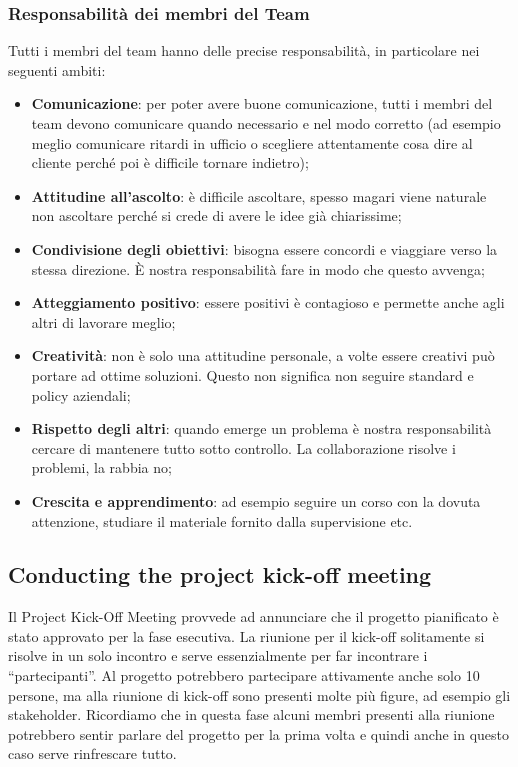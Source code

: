 \subsubsection{Responsabilità dei membri del Team}
Tutti i membri del team hanno delle precise responsabilità, in particolare nei seguenti ambiti:
\begin{itemize}
	\item \textbf{Comunicazione}: per poter avere buone comunicazione, tutti i membri del team devono comunicare quando necessario e nel modo corretto (ad esempio meglio comunicare ritardi in ufficio o scegliere attentamente cosa dire al cliente perché poi è difficile tornare indietro);
	\item \textbf{Attitudine all’ascolto}: è difficile ascoltare, spesso magari viene naturale non ascoltare perché si crede di avere le idee già chiarissime;
	\item \textbf{Condivisione degli obiettivi}: bisogna essere concordi e viaggiare verso la stessa direzione. È nostra responsabilità fare in modo che questo avvenga;
	\item \textbf{Atteggiamento positivo}: essere positivi è contagioso e permette anche agli altri di lavorare meglio;
	\item \textbf{Creatività}: non è solo una attitudine personale, a volte essere creativi può portare ad ottime soluzioni. Questo non significa non seguire standard e policy aziendali;
	\item \textbf{Rispetto degli altri}: quando emerge un problema è nostra responsabilità cercare di mantenere tutto sotto controllo. La collaborazione risolve i problemi, la rabbia no;
	\item \textbf{Crescita e apprendimento}: ad esempio seguire un corso con la dovuta attenzione, studiare il materiale fornito dalla supervisione etc.
\end{itemize}

\subsection{Conducting the project kick-off meeting}
Il Project Kick-Off Meeting provvede ad annunciare che il progetto pianificato è stato approvato per la fase esecutiva. La riunione per il kick-off solitamente si risolve in un solo incontro e serve essenzialmente per far incontrare i “partecipanti”. Al progetto potrebbero partecipare attivamente anche solo 10 persone, ma alla riunione di kick-off sono presenti molte più figure, ad esempio gli stakeholder. Ricordiamo che in questa fase alcuni membri presenti alla riunione potrebbero sentir parlare del progetto per la prima volta e quindi anche in questo caso serve rinfrescare tutto.
